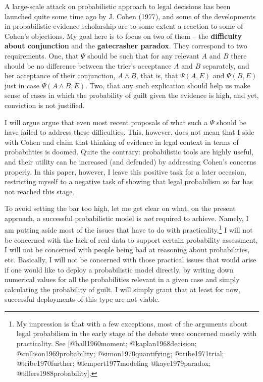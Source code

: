 \documentclass[10pt,dvipsnames,enabledeprecatedfontcommands]{scrartcl}
\begin{document}
A large-scale attack on probabilistic approach to legal decisions has
been launched quite some time ago by J. Cohen (1977), and some of the
developments in probabilistic evidence scholarship are to some extent a
reaction to some of Cohen's objections. My goal here is to focus on two
of them -- the \textbf{difficulty about conjunction} and the
\textbf{gatecrasher paradox}. They correspond to two requirements. One,
that \(\Psi\) should be such that for any relevant \(A\) and \(B\) there
should be no difference between the trier's acceptance \(A\) and \(B\)
separately, and her acceptance of their conjunction, \(A\wedge B\), that
is, that \(\Psi(A,E)\) and \(\Psi(B,E)\) just in case
\(\Psi(A\wedge B,E)\). Two, that any such explication should help us
make sense of cases in which the probability of guilt given the evidence
is high, and yet, conviction is not justified.

I will argue argue that even most recent proposals of what such a
\(\Psi\) should be have failed to address these difficulties. This,
however, does not mean that I side with Cohen and claim that thinking of
evidence in legal context in terms of probabilities is doomed. Quite the
contrary: probabilistic tools are highly useful, and their utility can
be increased (and defended) by addressing Cohen's concerns properly. In
this paper, however, I leave this positive task for a later occasion,
restricting myself to a negative task of showing that legal probabilism
so far has not reached this stage.

To avoid setting the bar too high, let me get clear on what, on the
present approach, a successful probabilistic model is \emph{not}
required to achieve. Namely, I am putting aside most of the issues that
have to do with
practicality.\footnote{My impression is that with a few exceptions, most of the arguments about legal probabilism in the early stage of the debate were concerned mostly with practicality. See   [@ball1960moment; @kaplan1968decision; @cullison1969probability; @simon1970quantifying;  @tribe1971trial; @tribe1970further; @lempert1977modeling @kaye1979paradox; @tillers1988probability].}
I will not be concerned with the lack of real data to support certain
probability assessment, I will not be concerned with people being bad at
reasoning about probabilities, etc. Basically, I will not be concerned
with those practical issues that would arise if one would like to deploy
a probabilistic model directly, by writing down numerical values for all
the probabilities relevant in a given case and simply calculating the
probability of guilt. I will simply grant that at least for now,
successful deployments of this type are not viable.
\end{document}
